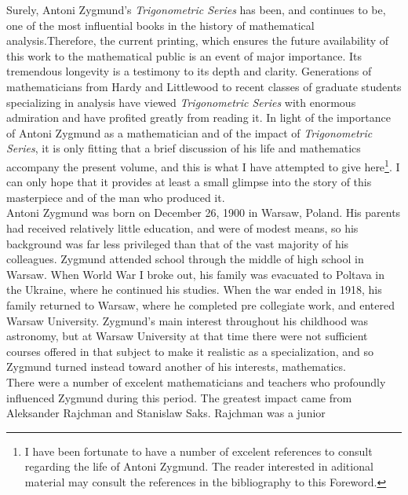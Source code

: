 %
%

\foreword
Surely, Antoni Zygmund's \textit{Trigonometric Series} has been, and continues to be, one of the most influential 
books in the history of mathematical analysis.Therefore, the current printing, which ensures the future availability of 
this work to the mathematical public is an event of major importance. Its tremendous longevity is a testimony 
to its depth and clarity. Generations of mathematicians from Hardy and Littlewood to recent classes of graduate 
students specializing in analysis have viewed \textit{Trigonometric Series} with enormous admiration and have 
profited greatly from reading it. In light of the importance of Antoni Zygmund as a mathematician and of the 
impact of \textit{Trigonometric Series}, it is only fitting that a brief discussion of his life and mathematics accompany 
the present volume, and this is what I have attempted to give here\footnote[1]{I have been fortunate to have a number of 
excelent references to consult regarding the life of Antoni Zygmund. The reader interested in aditional material 
may consult the references in the bibliography to this Foreword.}. I can only hope that it provides at least 
a small glimpse into the story of this masterpiece and of the man who produced it.\\
\indent Antoni Zygmund was born on December 26, 1900 in Warsaw, Poland. His parents had received relatively 
little education, and were of modest means, so his background was far less privileged than that of the vast majority 
of his colleagues. Zygmund attended school through the middle of high school in Warsaw. When World War I broke 
out, his family was evacuated to Poltava in the Ukraine, where he continued his studies. When the war ended 
in 1918, his family returned to Warsaw, where he completed pre collegiate work, and entered Warsaw University. 
Zygmund's main interest throughout his childhood was astronomy, but at Warsaw University at that time there 
were not sufficient courses offered in that subject to make it realistic as a specialization, and so 
Zygmund turned instead toward another of his interests, mathematics.\\
\indent  There were a number of excelent mathematicians and teachers who profoundly influenced Zygmund during 
this period. The greatest impact came from Aleksander Rajchman and Stanislaw Saks. Rajchman was a junior 
